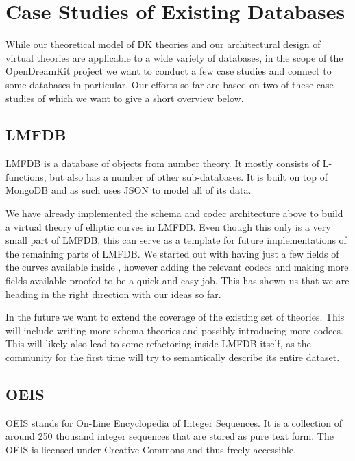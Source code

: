 \section{Case Studies of Existing Databases}\label{sec:cases}

While our theoretical model of DK theories and our architectural design of virtual
theories are applicable to a wide variety of databases, in the scope of the OpenDreamKit
project we want to conduct a few case studies and connect to some databases in
particular. Our efforts so far are based on two of these case studies of which we want to
give a short overview below.

\subsection{LMFDB}\label{sec:lmfdb}

LMFDB \cite{lmfdb} is a database of objects from number theory. It mostly consists of
L-functions, but also has a number of other sub-databases. It is built on top of MongoDB
and as such uses JSON to model all of its data.

We have already implemented the schema and codec architecture above to build a virtual
theory of elliptic curves in LMFDB. Even though this only is a very small part of LMFDB,
this can serve as a template for future implementations of the remaining parts of
LMFDB. We started out with having just a few fields of the curves available inside \MMT,
however adding the relevant codecs and making more fields available proofed to be a quick
and easy job. This has shown us that we are heading in the right direction with our ideas
so far.

In the future we want to extend the coverage of the existing set of theories. This will
include writing more schema theories and possibly introducing more codecs. This will
likely also lead to some refactoring inside LMFDB itself, as the community for the first
time will try to semantically describe its entire dataset.

\subsection{OEIS}

OEIS \cite{oeis} stands for On-Line Encyclopedia of Integer Sequences. It is a collection
of around 250 thousand integer sequences that are stored as pure text form. The OEIS is
licensed under Creative Commons and thus freely accessible.

